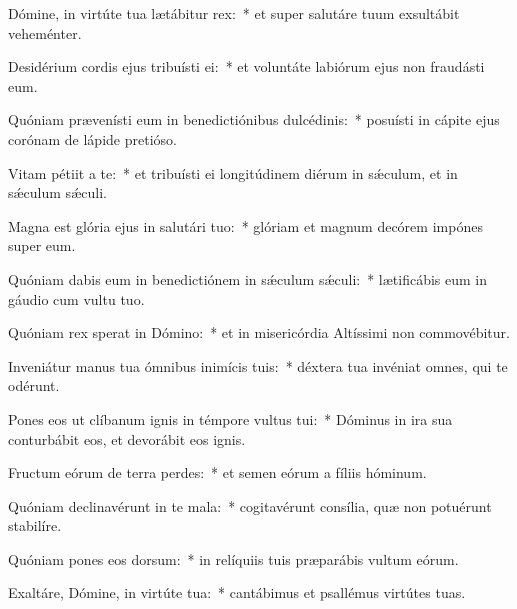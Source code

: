 \item Dómine, in virtúte tua lætábitur rex:~* et super salutáre tuum exsultábit veheménter.

\item Desidérium cordis ejus tribuísti ei:~* et voluntáte labiórum ejus non fraudásti eum.

\item Quóniam prævenísti eum in benedictiónibus dulcédinis:~* posuísti in cápite ejus corónam de lápide pretióso.

\item Vitam pétiit a te:~* et tribuísti ei longitúdinem diérum in sǽculum, et in sǽculum sǽculi.

\item Magna est glória ejus in salutári tuo:~* glóriam et magnum decórem impónes super eum.

\item Quóniam dabis eum in benedictiónem in sǽculum sǽculi:~* lætificábis eum in gáudio cum vultu tuo.

\item Quóniam rex sperat in Dómino:~* et in misericórdia Altíssimi non commovébitur.

\item Inveniátur manus tua ómnibus inimícis tuis:~* déxtera tua invéniat omnes, qui te odérunt.

\item Pones eos ut clíbanum ignis in témpore vultus tui:~* Dóminus in ira sua conturbábit eos, et devorábit eos ignis.

\item Fructum eórum de terra perdes:~* et semen eórum a fíliis hóminum.

\item Quóniam declinavérunt in te mala:~* cogitavérunt consília, quæ non potuérunt stabilíre.

\item Quóniam pones eos dorsum:~* in relíquiis tuis præparábis vultum eórum.

\item Exaltáre, Dómine, in virtúte tua:~* cantábimus et psallémus virtútes tuas.

